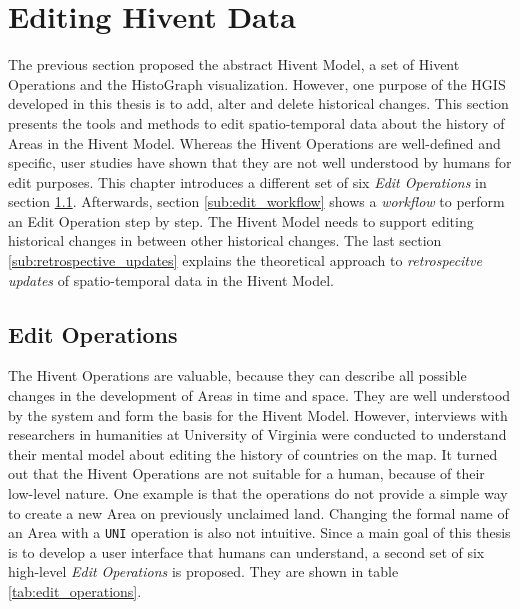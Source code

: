 
\section{Editing Hivent Data} %
\label{sec:editing_hivent_data}

The previous section proposed the abstract Hivent Model, a set of Hivent Operations and the HistoGraph visualization. However, one purpose of the HGIS developed in this thesis is to add, alter and delete historical changes. This section presents the tools and methods to edit spatio-temporal data about the history of Areas in the Hivent Model. Whereas the Hivent Operations are well-defined and specific, user studies have shown that they are not well understood by humans for edit purposes. This chapter introduces a different set of six \emph{Edit Operations} in section \ref{sub:edit_operations}. Afterwards, section \ref{sub:edit_workflow} shows a \emph{workflow} to perform an Edit Operation step by step. The Hivent Model needs to support editing historical changes in between other historical changes. The last section \ref{sub:retrospective_updates} explains the theoretical approach to \emph{retrospecitve updates} of spatio-temporal data in the Hivent Model.

\subsection{Edit Operations} %
\label{sub:edit_operations}

The Hivent Operations are valuable, because they can describe all possible changes in the development of Areas in time and space. They are well understood by the system and form the basis for the Hivent Model. However, interviews with researchers in humanities at University of Virginia were conducted to understand their mental model about editing the history of countries on the map. It turned out that the Hivent Operations are not suitable for a human, because of their low-level nature. One example is that the operations do not provide a simple way to create a new Area on previously unclaimed land. Changing the formal name of an Area with a \texttt{UNI} operation is also not intuitive. Since a main goal of this thesis is to develop a user interface that humans can understand, a second set of six high-level \emph{Edit Operations} is proposed. They are shown in table \ref{tab:edit_operations}.


